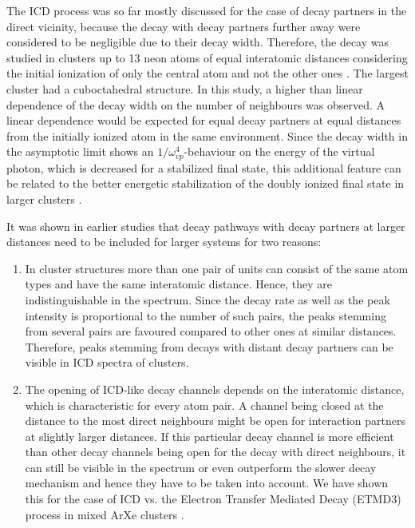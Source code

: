 The ICD process was so far mostly discussed for the case of decay partners in
the direct vicinity, because the decay with decay partners further away
were considered to be negligible due to their decay width.
Therefore, the decay was studied in clusters
up to 13 neon atoms of equal interatomic distances considering the initial
ionization of only the central
atom and not the other ones \cite{Santra01_3}. The largest cluster had
a cuboctahedral structure. In this study, a higher than
linear dependence of the decay width on the number of neighbours was
observed. A linear dependence would be expected for equal decay partners
at equal distances from the initially ionized atom in the same environment.
Since the decay width in the asymptotic limit shows an 
$1/\omega^{4}_{vp}$-behaviour on the energy of the virtual photon, which
is decreased for a stabilized final state, this additional feature
can be related to
the better energetic stabilization of the doubly ionized
final state in larger clusters \cite{Fasshauer13}.

It was shown in earlier studies
\cite{kryzhevoi2007,Fasshauer13,Fasshauer14_1,Fasshauer16_1}
that decay pathways with decay partners at larger distances need to
be included for larger systems for two reasons:
\begin{enumerate}
 \item In cluster structures more than one pair of units can consist of
       the same atom types and have the same interatomic distance. Hence,
       they are indistinguishable in the spectrum. Since the decay rate
       as well as the peak intensity
       is proportional to the number of such pairs,
       the peaks stemming from several pairs are favoured
       compared to other ones at similar distances. Therefore, peaks
       stemming from decays with distant decay partners can be visible
       in ICD spectra of clusters. \cite{Fasshauer14_1}
 \item The opening of ICD-like decay channels depends on the interatomic
       distance, which is characteristic for every atom pair.
       A channel being closed at the distance to the most direct
       neighbours might be open for interaction partners at slightly
       larger distances. If this particular decay channel is more efficient
       than other decay channels being open for the decay with direct
       neighbours, it can still be visible in the spectrum or even
       outperform the slower decay mechanism and hence they have to be
       taken into account. We have shown this for the case of ICD vs.
       the Electron Transfer Mediated Decay (ETMD3) process in mixed ArXe
       clusters \cite{Fasshauer13,Fasshauer16_1}.
\end{enumerate}

